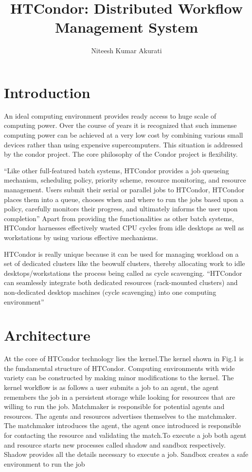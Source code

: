 \documentclass[9pt,twocolumn,twoside]{../../styles/osajnl}
\title{HTCondor: Distributed Workflow Management System}
\author[1,*]{Niteesh Kumar Akurati}
\affil[1]{School of Informatics and Computing, Bloomington, IN 47408, U.S.A.}
\affil[*]{Corresponding authors: akuratin@indiana.edu}
\begin{document}
\maketitle


\section{Introduction}
An ideal computing environment provides ready access to huge scale of
computing power. Over the course of years it is recognized that such
immense computing power can be achieved at a very low cost by
combining various small devices rather than using expensive
supercomputers. This situation is addressed by the condor project.
The core philosophy of the Condor project is flexibility.

``Like other full-featured batch systems, HTCondor provides a job
queueing mechanism, scheduling policy, priority scheme, resource
monitoring, and resource management. Users submit their serial or
parallel jobs to HTCondor, HTCondor places them into a queue, chooses
when and where to run the jobs based upon a policy, carefully monitors
their progress, and ultimately informs the user upon
completion''\cite{beowulfbook-condor} Apart from providing the
functionalities as other batch systems, HTCondor harnesses effectively
wasted CPU cycles from idle desktops as well as workstations by using
various effective mechanisms.

HTCondor is really unique because it can be used for managing workload
on a set of dedicated clusters like the beowulf clusters, thereby
allocating work to idle desktops/workstations the process being called
as cycle scavenging. ``HTCondor can seamlessly integrate both
dedicated resources (rack-mounted clusters) and non-dedicated desktop
machines (cycle scavenging) into one computing
environment''\cite{HTCondor_wikipedia}

\section{Architecture}

At the core of HTCondor technology lies the kernel.The kernel shown in
Fig.1 is the fundamental structure of HTCondor. Computing environments
with wide variety can be constructed by making minor modifications to
the kernel. The kernel workflow is as follows a user submits a job to
an agent, the agent remembers the job in a persistent storage while
looking for resources that are willing to run the job. Matchmaker is
responsible for potential agents and resources. The agents and
resources advertises themselves to the matchmaker. The matchmaker
introduces the agent, the agent once introduced is responsible for
contacting the resource and validating the match.To execute a job both
agent and resource starts new processes called shadow and sandbox
respectively. Shadow provides all the details necessary to execute a
job. Sandbox creates a safe environment to run the job
\cite{condor-practice}
\end{document}
